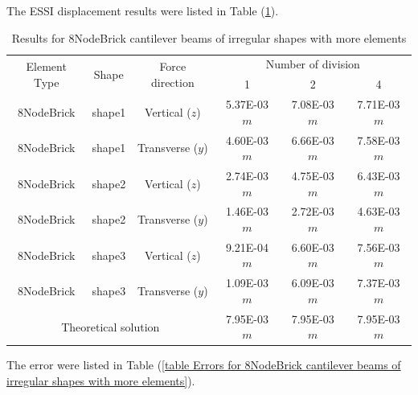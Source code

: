 \documentclass[fleqn,11pt]{article}
\begin{document}
The ESSI displacement results were listed in Table (\ref{table Results for 8NodeBrick cantilever beams of irregular shapes with more elements}).
\begin{table}[H]
  \centering
  \caption{Results for 8NodeBrick cantilever beams of irregular shapes with more elements}
  \label{table Results for 8NodeBrick cantilever beams of irregular shapes with more elements}
\begin{tabular}{|c|c|c|c|c|c|}
\hline
\multirow{2}{*}{Element Type} & \multirow{2}{*}{Shape}  & \multirow{2}{*}{Force direction}  & \multicolumn{3}{|c|}{Number of division} \\  \cline{4-6}
                        &        &                  &  1 &  2 &  4  \\ \hline
8NodeBrick              & shape1 & Vertical ($z$)   & 5.37E-03 $m$  & 7.08E-03 $m$  & 7.71E-03  $m$ \\ \hline
8NodeBrick              & shape1 & Transverse ($y$) & 4.60E-03 $m$  & 6.66E-03 $m$  & 7.58E-03  $m$ \\ \hline
8NodeBrick              & shape2 & Vertical ($z$)   & 2.74E-03 $m$& 4.75E-03 $m$& 6.43E-03  $m$ \\ \hline
8NodeBrick              & shape2 & Transverse ($y$) & 1.46E-03 $m$& 2.72E-03 $m$& 4.63E-03  $m$ \\ \hline
8NodeBrick              & shape3 & Vertical ($z$)   & 9.21E-04 $m$  & 6.60E-03 $m$  & 7.56E-03  $m$ \\ \hline
8NodeBrick              & shape3 & Transverse ($y$) & 1.09E-03 $m$  & 6.09E-03 $m$  & 7.37E-03  $m$ \\ \hline
 \multicolumn{3}{|c|}{Theoretical solution}      & 7.95E-03 $m$  & 7.95E-03 $m$  & 7.95E-03  $m$ \\
\hline
\end{tabular}
\end{table}

The error were listed in Table (\ref{table Errors for 8NodeBrick cantilever beams of irregular shapes with more elements}). 
\end{document}
